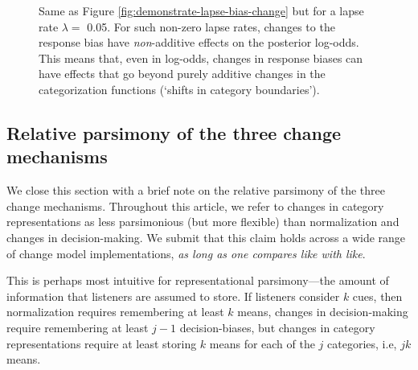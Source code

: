 \documentclass[
  11pt,
  man,floatsintext]{apa6}
\begin{document}
\begin{figure}

{\centering {}

}

\caption[Same as Figure \ref{fig:demonstrate-lapse-bias-change} but for a lapse rate \(\lambda=\) 0.05. For such non-zero lapse rates, changes to the response bias have \emph{non}-additive effects on the posterior log-odds. This means that, even in log-odds, changes in response biases can have effects that go beyond purely additive changes in the categorization functions (`shifts in category boundaries').]{Same as Figure \ref{fig:demonstrate-lapse-bias-change} but for a lapse rate \(\lambda=\) 0.05. For such non-zero lapse rates, changes to the response bias have \emph{non}-additive effects on the posterior log-odds. This means that, even in log-odds, changes in response biases can have effects that go beyond purely additive changes in the categorization functions (`shifts in category boundaries').}\label{fig:demonstrate-lapse-bias-change-nonzero-lapse}
\end{figure}

\hypertarget{sec:parsimony}{%
\subsection{Relative parsimony of the three change mechanisms}\label{sec:parsimony}}

We close this section with a brief note on the relative parsimony of the three change mechanisms. Throughout this article, we refer to changes in category representations as less parsimonious (but more flexible) than normalization and changes in decision-making. We submit that this claim holds across a wide range of change model implementations, \emph{as long as one compares like with like}.

This is perhaps most intuitive for representational parsimony---the amount of information that listeners are assumed to store. If listeners consider \(k\) cues, then normalization requires remembering at least \(k\) means, changes in decision-making require remembering at least \(j-1\) decision-biases, but changes in category representations require at least storing \(k\) means for each of the \(j\) categories, i.e, \(jk\) means.
\end{document}
